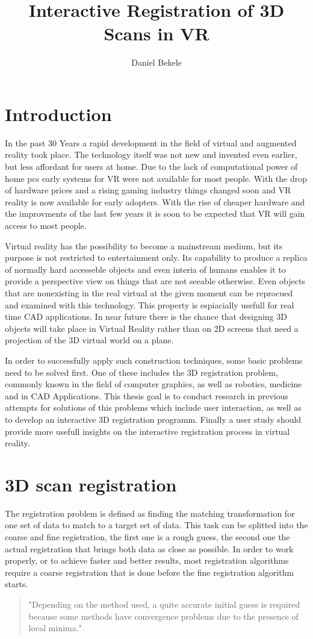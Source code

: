 \documentclass[hyperref,english,bachelorofscience,bibnum]{cgvpub}
\author{Daniel Bekele}
\title{Interactive Registration of 3D Scans in VR}
\begin{document}
\chapter{Introduction}
In the past 30 Years a rapid development in the field of  virtual and augmented reality took place. The technology itself was not new and invented even earlier, but less affordant for users at home. Due to the lack of computational power of home pcs early systems for VR were not available for most people. With the drop of hardware prices and a rising gaming industry things changed soon and VR reality is now available for early adopters. With the rise of cheaper hardware and the improvments of the last few years it is soon to be expected that VR will gain access to most people.

Virtual reality has the possibility to become a mainstream medium, but its purpose is not restricted to entertainment only. Its capability to produce a replica of normally hard accesseble objects and even interia of humans enables it to provide a perspective view on things that are not seeable otherwise. Even objects that are nonexisting in the real virtual at the given moment can be reprocued and examined with this technology. This property is espiacially usefull for real time CAD applications. In near future there is the chance that designing 3D objects will take place in Virtual Reality rather than on 2D screens that need a projection of the 3D virtual world on a plane.

In order to successfully apply such construction techniques, some basic problems need to be solved first. One of these includes the 3D registration problem, commonly known in the field of computer graphics, as well as robotics, medicine and in CAD Applications.
This thesis goal is to conduct research in previous attempts for solutions of this problems which include user interaction, as well as to develop an interactive 3D registration programm. Finally a user study should provide more usefull insights on the interactive registration process in virtual reality.

\chapter{3D scan registration}
The registration problem is defined as finding the matching transformation for one set of data to match to a target set of data.%
This task can be splitted into the coarse and fine registration, the first one is a rough guess, the second one the actual registration that brings both data as close as possible.
In order to work properly, or to achieve faster and better results, most registration algorithms require a coarse registration that is done before the fine registration algorithm starts. 
\begin{quote}
"Depending on the method used, a quite accurate initial
guess is required because some methods have convergence
problems due to the presence of local minima."\cite{salvi2007}
\end{quote}
\end{document}
